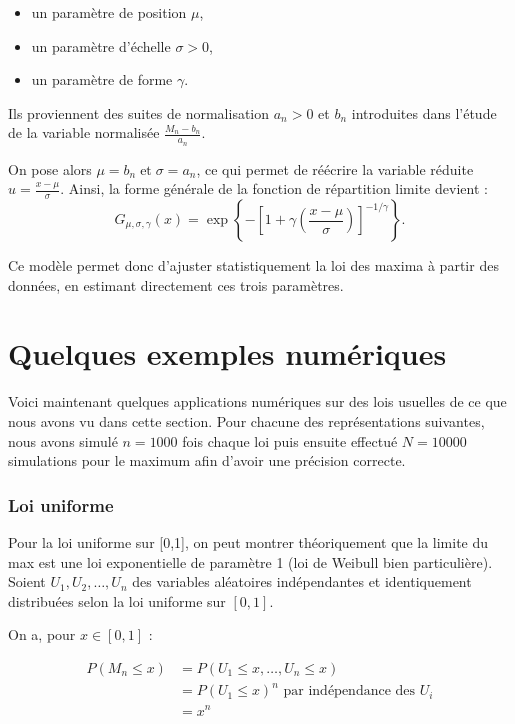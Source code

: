 \documentclass{article}
\theoremstyle{plain}
\theoremstyle{definition}
\theoremstyle{plain}
\begin{document}
\begin{itemize}
  \item un paramètre de position $\mu$,
  \item un paramètre d’échelle $\sigma > 0$,
  \item un paramètre de forme $\gamma$.
\end{itemize}

Ils proviennent des suites de normalisation $a_n > 0$ et $b_n$ introduites dans l’étude de la variable normalisée \(\frac{M_n - b_n}{a_n}\). 

On pose alors $\mu = b_n \; \text{et} \; \sigma = a_n$, ce qui permet de réécrire la variable réduite \(u = \frac{x - \mu}{\sigma}\). Ainsi, la forme générale de la fonction de répartition limite devient :
\[
G_{\mu, \sigma, \gamma}(x) = \exp\left\{-\left[1 + \gamma \left(\frac{x - \mu}{\sigma} \right)\right]^{-1/\gamma} \right\}.
\]

Ce modèle permet donc d’ajuster statistiquement la loi des maxima à partir des données, en estimant directement ces trois paramètres.


\newpage
\section{Quelques exemples numériques}

\noindent Voici maintenant quelques applications numériques sur des lois usuelles de ce que nous avons vu dans cette section. Pour chacune des représentations suivantes, nous avons simulé $n=1000$ fois chaque loi puis ensuite effectué $N=10000$ simulations pour le maximum afin d'avoir une précision correcte. 

\subsubsection{Loi uniforme}

\noindent Pour la loi uniforme sur [0,1], on peut montrer théoriquement que la limite du max est une loi exponentielle de paramètre 1 (loi de Weibull bien particulière). \\
\noindent Soient \( U_1, U_2, \dots, U_n \) des variables aléatoires indépendantes et identiquement distribuées selon la loi uniforme sur \([0,1]\).

\noindent On a, pour $ x \in [0,1]$ :

\begin{align*}
	P(M_n \leq x) &= P(U_1 \leq x, \dots, U_n \leq x) \\
	&= P(U_1 \leq x)^n \text{ par indépendance des $U_i$}\\
	&= x^n
\end{align*}
\end{document}
